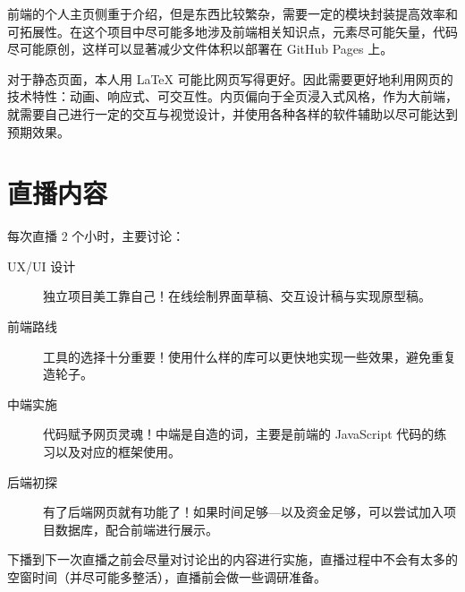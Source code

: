 \documentclass[UTF8]{ctexart}
\begin{document}
    前端的个人主页侧重于介绍，但是东西比较繁杂，需要一定的模块封装提高效率和可拓展性。在这个项目中尽可能多地涉及前端相关知识点，元素尽可能矢量，代码尽可能原创，这样可以显著减少文件体积以部署在 GitHub Pages 上。

    对于静态页面，本人用 \LaTeX{} 可能比网页写得更好。因此需要更好地利用网页的技术特性：动画、响应式、可交互性。内页偏向于全页浸入式风格，作为大前端，就需要自己进行一定的交互与视觉设计，并使用各种各样的软件辅助以尽可能达到预期效果。


\section{直播内容}

    每次直播 2 个小时，主要讨论：
    \begin{description}
        \item[UX/UI 设计] 独立项目美工靠自己！在线绘制界面草稿、交互设计稿与实现原型稿。
        \item[前端路线] 工具的选择十分重要！使用什么样的库可以更快地实现一些效果，避免重复造轮子。
        \item[中端实施] 代码赋予网页灵魂！中端是自造的词，主要是前端的 JavaScript 代码的练习以及对应的框架使用。
        \item[后端初探] 有了后端网页就有功能了！如果时间足够---以及资金足够，可以尝试加入项目数据库，配合前端进行展示。 
    \end{description}

    下播到下一次直播之前会尽量对讨论出的内容进行实施，直播过程中不会有太多的空窗时间（并尽可能多整活），直播前会做一些调研准备。

    \begin{figure}[h]
        \centering
    \end{figure}
\end{document}
